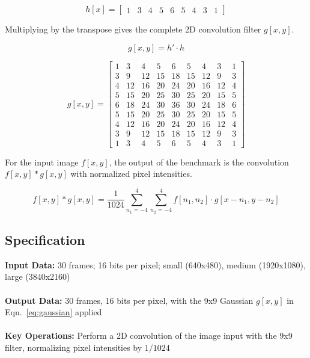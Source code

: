 \documentclass{report}
\begin{document}
\begin{equation}
h[x] =
 \begin{bmatrix}
  1 & 3 & 4 & 5 & 6 & 5 & 4 & 3 & 1
 \end{bmatrix}
\end{equation}

Multiplying by the transpose gives the complete 2D convolution filter $g[x,y]$.

\begin{equation}
  g[x,y] = h' \cdot h
\end{equation}

\begin{equation}
g[x,y] =
 \begin{bmatrix}
  1&   3&   4&   5&   6&   5&  4&    3&  1 \\
  3&   9&  12&  15&  18&  15&  12&   9&  3 \\
  4&  12&  16&  20&  24&  20&  16&  12&  4 \\
  5&  15&  20&  25&  30&  25&  20&  15&  5 \\
  6&  18&  24&  30&  36&  30&  24&  18&  6 \\
  5&  15&  20&  25&  30&  25&  20&  15&  5 \\
  4&  12&  16&  20&  24&  20&  16&  12&  4 \\
  3&   9&  12&  15&  18&  15&  12&   9&  3 \\
  1&   3&   4&   5&   6&   5&   4&   3&  1
 \end{bmatrix}
 \label{eq:gaussian}
\end{equation}

For the input image $f[x,y]$, the output of the benchmark is the convolution
$f[x,y] \ast g[x,y]$ with normalized pixel intensities.

\begin{equation}
 f[x,y] \ast g[x,y] = \frac{1}{1024} \sum_{n_1 = -4}^{4}
    \sum_{n_2 = -4}^{4} f[n_1,n_2] \cdot g[x-n_1,y-n_2]
\end{equation} 

\subsection{Specification}

\textbf{Input Data:}  30 frames; 16 bits per pixel; small (640x480), medium (1920x1080), large (3840x2160) \\ \\
\textbf{Output Data:}  30 frames, 16 bits per pixel,
with the 9x9 Gaussian
$g[x,y]$ in Eqn.~\ref{eq:gaussian} applied \\ \\
\textbf{Key Operations:}  Perform a 2D convolution of the image input with the 9x9 filter,
normalizing pixel intensities by $1/1024$
\end{document}

